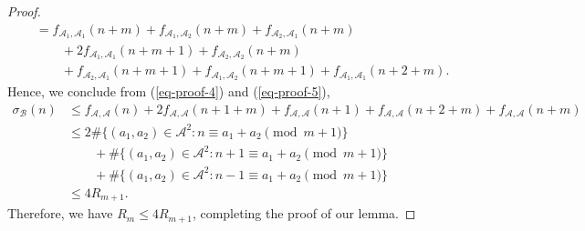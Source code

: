 \documentclass[10pt,a4paper]{amsart}
\begin{document}
\begin{proof}
\begin{align}
    &= f_{\mathcal{A}_{1},\mathcal{A}_{1}}(n+m)+f_{\mathcal{A}_{1},\mathcal{A}_{2}}(n+m)
    +f_{\mathcal{A}_{2},\mathcal{A}_{1}}(n+m)\nonumber\\
    &\quad \quad +2f_{\mathcal{A}_{1},\mathcal{A}_{1}}(n+m+1)+f_{\mathcal{A}_{2},\mathcal{A}_{2}}(n+m)\nonumber\\
    &\quad \quad +f_{\mathcal{A}_{2},\mathcal{A}_{1}}(n+m+1)+f_{\mathcal{A}_{1},\mathcal{A}_{2}}(n+m+1)+f_{\mathcal{A}_{1},\mathcal{A}_{1}}(n+2+m).
\end{align}
Hence, we conclude from (\ref{eq-proof-4}) and (\ref{eq-proof-5}),
\begin{align*}
    \sigma_{\mathcal{B}}(n)&\le f_{\mathcal{A},\mathcal{A}}(n)+2f_{\mathcal{A},\mathcal{A}}(n+1+m)+f_{\mathcal{A},\mathcal{A}}(n+1)+f_{\mathcal{A},\mathcal{A}}(n+2+m)+f_{\mathcal{A},\mathcal{A}}(n+m)\nonumber\\
    &\le2\#\big\{(a_1,a_2)\in \mathcal{A}^2: n\equiv a_1+a_2 \pmod{m+1}\big\}\nonumber\\
    &\quad \quad +\#\big\{(a_1,a_2)\in \mathcal{A}^2: n+1\equiv a_1+a_2\pmod{m+1}\big\}\nonumber\\
    &\quad \quad +\#\big\{(a_1,a_2)\in \mathcal{A}^2: n-1\equiv a_1+a_2\pmod{m+1}\big\}\nonumber\\
    &\le 4R_{m+1}.
\end{align*}
Therefore, we have $R_{m}\le 4 R_{m+1}$, completing the proof of our lemma.
 \end{proof}
\end{document}

